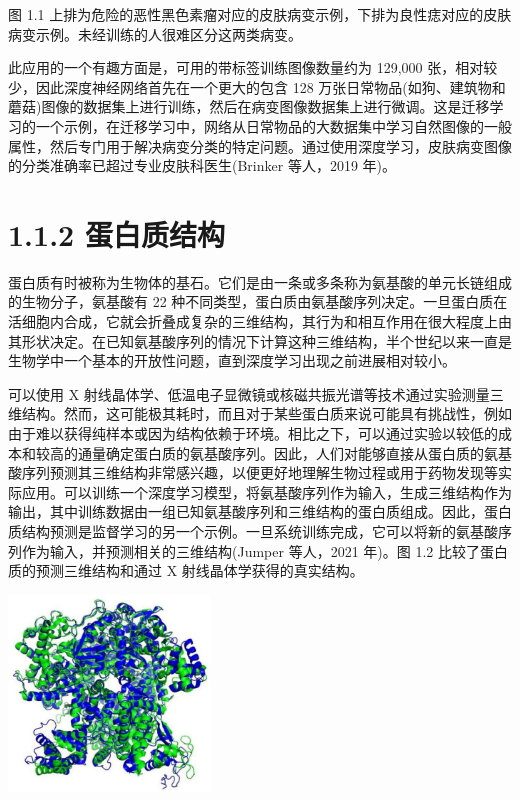 \documentclass[10pt]{report}
\begin{document}
图 1.1 上排为危险的恶性黑色素瘤对应的皮肤病变示例，下排为良性痣对应的皮肤病变示例。未经训练的人很难区分这两类病变。

此应用的一个有趣方面是，可用的带标签训练图像数量约为 129,000 张，相对较少，因此深度神经网络首先在一个更大的包含 128 万张日常物品(如狗、建筑物和蘑菇)图像的数据集上进行训练，然后在病变图像数据集上进行微调。这是迁移学习的一个示例，在迁移学习中，网络从日常物品的大数据集中学习自然图像的一般属性，然后专门用于解决病变分类的特定问题。通过使用深度学习，皮肤病变图像的分类准确率已超过专业皮肤科医生(Brinker 等人，2019 年)。

\section*{1.1.2 蛋白质结构}

蛋白质有时被称为生物体的基石。它们是由一条或多条称为氨基酸的单元长链组成的生物分子，氨基酸有 22 种不同类型，蛋白质由氨基酸序列决定。一旦蛋白质在活细胞内合成，它就会折叠成复杂的三维结构，其行为和相互作用在很大程度上由其形状决定。在已知氨基酸序列的情况下计算这种三维结构，半个世纪以来一直是生物学中一个基本的开放性问题，直到深度学习出现之前进展相对较小。

可以使用 X 射线晶体学、低温电子显微镜或核磁共振光谱等技术通过实验测量三维结构。然而，这可能极其耗时，而且对于某些蛋白质来说可能具有挑战性，例如由于难以获得纯样本或因为结构依赖于环境。相比之下，可以通过实验以较低的成本和较高的通量确定蛋白质的氨基酸序列。因此，人们对能够直接从蛋白质的氨基酸序列预测其三维结构非常感兴趣，以便更好地理解生物过程或用于药物发现等实际应用。可以训练一个深度学习模型，将氨基酸序列作为输入，生成三维结构作为输出，其中训练数据由一组已知氨基酸序列和三维结构的蛋白质组成。因此，蛋白质结构预测是监督学习的另一个示例。一旦系统训练完成，它可以将新的氨基酸序列作为输入，并预测相关的三维结构(Jumper 等人，2021 年)。图 1.2 比较了蛋白质的预测三维结构和通过 \(\mathrm{X}\) 射线晶体学获得的真实结构。

\begin{center}
\includegraphics[max width=0.4\textwidth]{images/0194e279-9b28-703a-88f4-c3ac21e2010d_23_983_356_566_553_0.jpg}
\end{center}
\hspace*{3em} 
\end{document}

